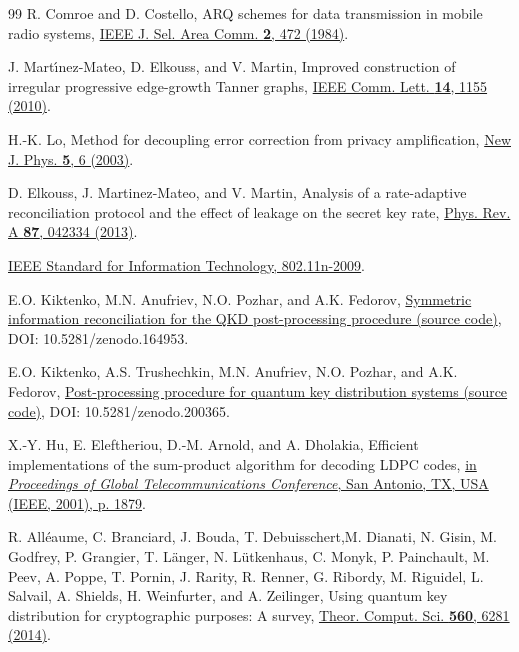 \documentclass[aps,pra,twocolumn,amsmath,amssymb,nofootinbib,showpacs,superscriptaddress]{revtex4-1}
\begin{document}
\begin{thebibliography}{99}
R. Comroe and D. Costello,
ARQ schemes for data transmission in mobile radio systems,
{\href{https://dx.doi.org/10.1109/JSAC.1984.1146084}{IEEE J. Sel. Area Comm. {\bf 2}, 472 (1984)}}.

J. Mart{\'{\i}}nez{-}Mateo, D. Elkouss, and V. Martin,
Improved construction of irregular progressive edge-growth Tanner graphs,
{\href{https://dx.doi.org/10.1109/LCOMM.2010.101810.101384}{IEEE Comm. Lett. {\bf 14}, 1155 (2010)}}.

H.-K. Lo,
Method for decoupling error correction from privacy amplification,
{\href{https://dx.doi.org/10.1088/1367-2630/5/1/336}{New J. Phys. {\bf 5}, 6 (2003)}}.

D. Elkouss, J. Martinez-Mateo, and V. Martin, 
Analysis of a rate-adaptive reconciliation protocol and the effect of leakage on the secret key rate,
{\href{https://dx.doi.org/10.1103/PhysRevA.87.042334}{Phys. Rev. A {\bf 87}, 042334 (2013)}}.

{\href{https://dx.doi.org/10.1109/IEEESTD.2009.5307322}{IEEE Standard for Information Technology, 802.11n-2009}}.

E.O. Kiktenko, M.N. Anufriev, N.O. Pozhar, and A.K. Fedorov,
{\href{https://dx.doi.org/10.5281/zenodo.164953}{Symmetric information reconciliation for the QKD post-processing procedure (source code)}},
DOI: 10.5281/zenodo.164953.

E.O. Kiktenko, A.S. Trushechkin, M.N. Anufriev, N.O. Pozhar, and A.K. Fedorov,
{\href{https://dx.doi.org/10.5281/zenodo.200365}{Post-processing procedure for quantum key distribution systems (source code)}},
DOI: 10.5281/zenodo.200365.

X.-Y. Hu, E. Eleftheriou, D.-M. Arnold, and A. Dholakia,
Efficient implementations of the sum-product algorithm for decoding LDPC codes,
{\href{https://dx.doi.org/10.1109/GLOCOM.2001.965575}
{in {\it Proceedings of Global Telecommunications Conference}, San Antonio, TX, USA (IEEE, 2001), p. 1879}}.

R. All\'eaume, C. Branciard, J. Bouda, T. Debuisschert,M. Dianati, N. Gisin, M. Godfrey, P. Grangier, T. L\"anger, N. L\"utkenhaus, C. Monyk, P. Painchault, M. Peev, A. Poppe, T. Pornin, J. Rarity, R. Renner, G. Ribordy, M. Riguidel, L. Salvail, A. Shields, H. Weinfurter, and A. Zeilinger,
Using quantum key distribution for cryptographic purposes: A survey,
{\href{https://doi.org/10.1016/j.tcs.2014.09.018}{Theor. Comput. Sci. {\bf 560}, 6281 (2014)}}.


\end{thebibliography}
\end{document}
